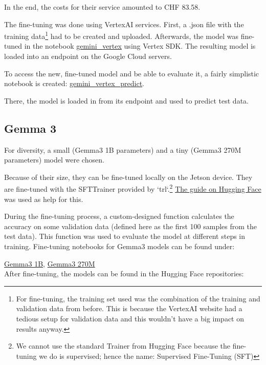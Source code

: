 \documentclass{article}
\begin{document}
In the end, the costs for their service amounted to CHF 83.58.

The fine-tuning was done using VertexAI services. First, a .json file with the training data\footnote{For fine-tuning, the training set used was the combination of the training and validation data from before. This is because the VertexAI website had a tedious setup for validation data and this wouldn't have a big impact on results anyway.} had to be created and uploaded. Afterwards, the model was fine-tuned in the notebook \href{https://github.com/AntonStantan/matura/blob/main/pre-trained-tranformers/gemini_vertex.ipynb}{gemini\_vertex} using Vertex SDK. The resulting model is loaded into an endpoint on the Google Cloud servers.

To access the new, fine-tuned model and be able to evaluate it, a fairly simplistic notebook is created: \href{https://github.com/AntonStantan/matura/blob/main/pre-trained-tranformers/gemini_vertex_predict.ipynb}{gemini\_vertex\_predict}.

There, the model is loaded in from its endpoint and used to predict test data.

\subsection{Gemma 3}
For diversity, a small (Gemma3 1B parameters) and a tiny (Gemma3 270M parameters) model were chosen.

Because of their size, they can be fine-tuned locally on the Jetson device. They are fine-tuned with the SFTTrainer provided by `trl`.\footnote{We cannot use the standard Trainer from Hugging Face because the fine-tuning we do is supervised; hence the name: Supervised Fine-Tuning (SFT)} \href{https://huggingface.co/docs/trl/en/sft_trainer}{The guide on Hugging Face} was used as help for this.

During the fine-tuning process, a custom-designed function calculates the accuracy on some validation data (defined here as the first 100 samples from the test data). This function was used to evaluate the model at different steps in training. Fine-tuning notebooks for Gemma3 models can be found under:

\href{https://github.com/AntonStantan/matura/blob/main/pre-trained-tranformers/big_gemma_huggingface.ipynb}{Gemma3 1B}, \href{https://github.com/AntonStantan/matura/blob/main/pre-trained-tranformers/gemma_huggingface.ipynb}{Gemma3 270M}
\\[2em]
After fine-tuning, the models can be found in the Hugging Face repositories:
\end{document}
